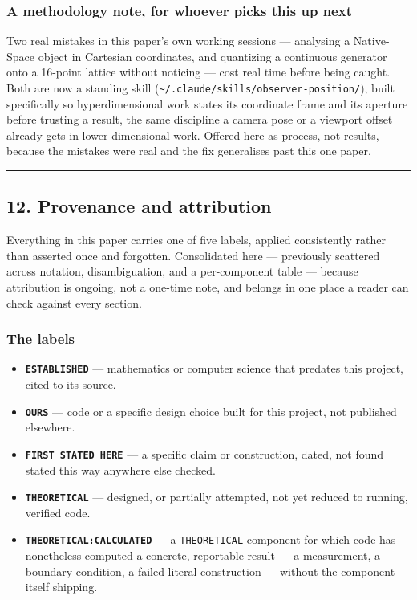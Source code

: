 \documentclass[
  10pt,
]{article}
\providecommand{\tightlist}{%
  \setlength{\itemsep}{0pt}\setlength{\parskip}{0pt}}
\begin{document}
\hypertarget{a-methodology-note-for-whoever-picks-this-up-next}{%
\subsubsection{A methodology note, for whoever picks this up
next}\label{a-methodology-note-for-whoever-picks-this-up-next}}

Two real mistakes in this paper's own working sessions --- analysing a
Native-Space object in Cartesian coordinates, and quantizing a
continuous generator onto a 16-point lattice without noticing --- cost
real time before being caught. Both are now a standing skill
(\texttt{\textasciitilde{}/.claude/skills/observer-position/}), built
specifically so hyperdimensional work states its coordinate frame and
its aperture before trusting a result, the same discipline a camera pose
or a viewport offset already gets in lower-dimensional work. Offered
here as process, not results, because the mistakes were real and the fix
generalises past this one paper.

\begin{center}\rule{0.5\linewidth}{0.5pt}\end{center}

\hypertarget{provenance-and-attribution}{%
\subsection{12. Provenance and
attribution}\label{provenance-and-attribution}}

Everything in this paper carries one of five labels, applied
consistently rather than asserted once and forgotten. Consolidated here
--- previously scattered across notation, disambiguation, and a
per-component table --- because attribution is ongoing, not a one-time
note, and belongs in one place a reader can check against every section.

\hypertarget{the-labels}{%
\subsubsection{The labels}\label{the-labels}}

\begin{itemize}
\tightlist
\item
  \textbf{\texttt{ESTABLISHED}} --- mathematics or computer science that
  predates this project, cited to its source.
\item
  \textbf{\texttt{OURS}} --- code or a specific design choice built for
  this project, not published elsewhere.
\item
  \textbf{\texttt{FIRST\ STATED\ HERE}} --- a specific claim or
  construction, dated, not found stated this way anywhere else checked.
\item
  \textbf{\texttt{THEORETICAL}} --- designed, or partially attempted,
  not yet reduced to running, verified code.
\item
  \textbf{\texttt{THEORETICAL:CALCULATED}} --- a \texttt{THEORETICAL}
  component for which code has nonetheless computed a concrete,
  reportable result --- a measurement, a boundary condition, a failed
  literal construction --- without the component itself shipping.
\end{itemize}
\end{document}
